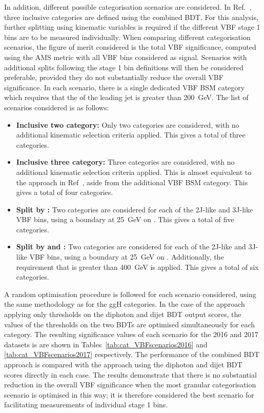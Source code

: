 In addition, different possible categorisation scenarios are considered.
In Ref.~\cite{HIG-16-040}, three inclusive categories are defined using the combined BDT.
For this analysis, further splitting using kinematic variables is required 
if the different VBF stage 1 bins are to be measured individually.
When comparing different categorisation scenarios,
the figure of merit considered is the total VBF significance, 
computed using the AMS metric with all VBF bins considered as signal.
Scenarios with additional splits following the stage 1 bin definitions 
will then be considered preferable, 
provided they do not substantially reduce the overall VBF significance.
In each scenario, there is a single dedicated VBF BSM category 
which requires that the \pt of the leading jet is greater than \SI{200}{GeV}.
The list of scenarios considered is as follows:
\begin{itemize}
\item \textbf{Inclusive two category:} Only two categories are considered, 
      with no additional kinematic selection criteria applied.
      This gives a total of three categories.
\item \textbf{Inclusive three category:} Three categories are considered, 
      with no additional kinematic selection criteria applied.
      This is almost equivalent to the approach in Ref~\cite{HIG-16-040}, 
      aside from the additional VBF BSM category.
      This gives a total of four categories.
\item \textbf{Split by \ptHjj:} Two categories are considered 
      for each of the 2J-like and 3J-like VBF bins,
      using a boundary at \SI{25}{GeV} on \ptHjj.
      This gives a total of five categories.
\item \textbf{Split by \ptHjj and \mjj:} Two categories are considered
      for each of the 2J-like and 3J-like VBF bins,
      using a boundary at \SI{25}{GeV} on \ptHjj.
      Additionally, the requirement that \mjj is greater than \SI{400}{GeV} is applied.
      This gives a total of six categories.
\end{itemize}

A random optimisation procedure is followed for each scenario considered, 
using the same methodology as for the ggH categories.
In the case of the approach applying only thresholds on the diphoton and dijet BDT output scores, 
the values of the thresholds on the two BDTs are optimised simultaneously for each category.
The resulting significance values of each scenario for the 2016 and 2017 datasets is 
are shown in Tables~\ref{tab:cat_VBFscenarios2016} and \ref{tab:cat_VBFscenarios2017} respectively.
The performance of the combined BDT approach is compared with the approach using the diphoton 
and dijet BDT scores directly in each case.
The results demonstrate that there is no substantial reduction in the overall VBF significance
when the most granular categorisation scenario is optimised in this way;
it is therefore considered the best scenario for facilitating measurements of individual stage 1 bins.

